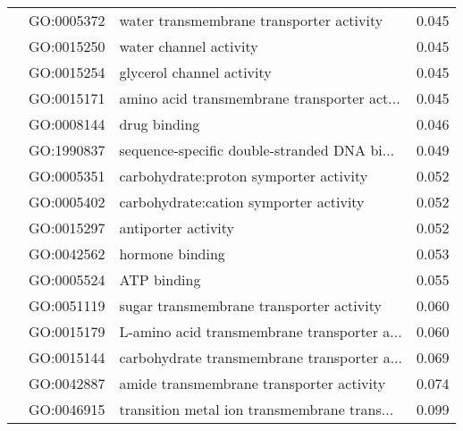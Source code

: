 \begin{longtable}{lllr}
   & GO:0005372 &     water transmembrane transporter activity &         0.045 \\
   & GO:0015250 &                       water channel activity &         0.045 \\
   & GO:0015254 &                    glycerol channel activity &         0.045 \\
   & GO:0015171 &  amino acid transmembrane transporter act... &         0.045 \\
   & GO:0008144 &                                 drug binding &         0.046 \\
   & GO:1990837 &  sequence-specific double-stranded DNA bi... &         0.049 \\
   & GO:0005351 &       carbohydrate:proton symporter activity &         0.052 \\
   & GO:0005402 &       carbohydrate:cation symporter activity &         0.052 \\
   & GO:0015297 &                          antiporter activity &         0.052 \\
   & GO:0042562 &                              hormone binding &         0.053 \\
   & GO:0005524 &                                  ATP binding &         0.055 \\
   & GO:0051119 &     sugar transmembrane transporter activity &         0.060 \\
   & GO:0015179 &  L-amino acid transmembrane transporter a... &         0.060 \\
   & GO:0015144 &  carbohydrate transmembrane transporter a... &         0.069 \\
   & GO:0042887 &     amide transmembrane transporter activity &         0.074 \\
   & GO:0046915 &  transition metal ion transmembrane trans... &         0.099 \\
\end{longtable}
